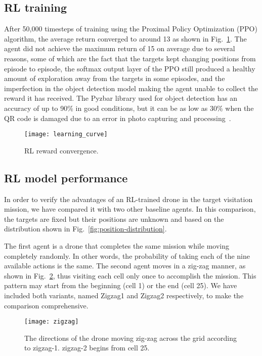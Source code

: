 \documentclass[../main.tex]{subfiles}
\begin{document}
\lipsum[1]

\subsection{RL training}

After 50,000 timesteps of training using the Proximal Policy
Optimization (PPO) algorithm, the average return converged
to around 13 as shown in Fig.~\ref{fig:learning-curve}.
The agent did not achieve the maximum return of 15
on average
due to several reasons, some of which are the fact that the
targets kept changing positions from episode to episode,
the softmax output layer of the PPO still produced 
a healthy amount
of exploration away from the targets in some episodes,
and the imperfection in the object detection model making
the agent unable to collect the reward it has received. 
The Pyzbar library used for object detection has
an accuracy of up to 90\% in good conditions, but it can 
be as low as 30\% when the QR code is damaged due to
an error in photo capturing and processing~\cite{dynamsoft}.

\begin{figure}[!t]
	\centering
	\texttt{[image: learning\_curve]}
	\caption{RL reward convergence.}
	\label{fig:learning-curve}
\end{figure}

\subsection{RL model performance}

In order to verify the advantages of an RL-trained drone
in the target visitation mission, we have compared it with
two other baseline agents.
In this comparison, the targets are fixed but their
positions are unknown and based on the distribution
shown in Fig.~\ref{fig:position-distribution}.

The first agent is a drone that completes the same mission 
while moving completely randomly. 
In other words, the probability of taking each of the 
nine available actions is the same.
The second agent moves in a zig-zag manner, as shown
in Fig.~\ref{fig:zigzag}, thus visiting
each cell only once to accomplish the mission.
This pattern may start from the beginning (cell 1) or 
the end (cell 25).
We have included both variants, named Zigzag1 and Zigzag2
respectively, to make the comparison comprehensive.

\begin{figure}[!t]
	\centering
	\texttt{[image: zigzag]}
	\caption{The directions of the drone moving zig-zag
		across the grid according to zigzag-1.
                zigzag-2 begins from cell 25.}
	\label{fig:zigzag}
\end{figure}
\end{document}
